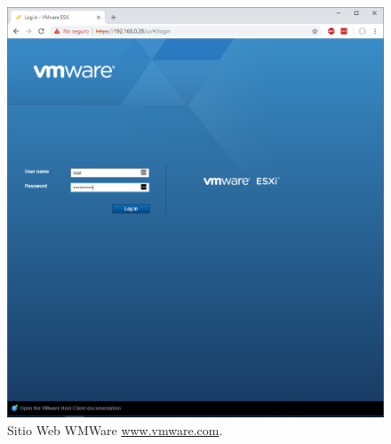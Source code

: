\begin{figure}[!hbtp]
	\centering
	\includegraphics[width=\linewidth]{Trabajo/RecursosEducativos/RE01_VMwareESXi/RE_VMwareInstalacion15.png}
	\vspace{-0.2cm}
	\caption{Sitio Web WMWare \url{www.vmware.com}.\footnotemark[2]{} }
	\label{fig:VMwareInstalacion15}
\end{figure}

